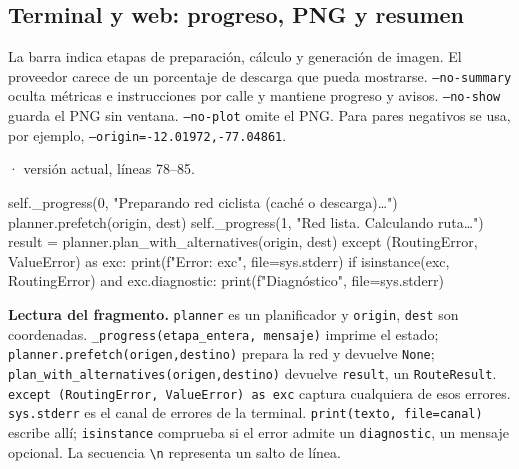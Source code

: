 \documentclass[11pt,a4paper]{article}
\begin{document}
\subsection{Terminal y web: progreso, PNG y resumen}
La barra indica etapas de preparación, cálculo y generación de imagen. El proveedor carece de un porcentaje de descarga que pueda mostrarse. \texttt{--no-summary} oculta métricas e instrucciones por calle y mantiene progreso y avisos. \texttt{--no-show} guarda el PNG sin ventana. \texttt{--no-plot} omite el PNG. Para pares negativos se usa, por ejemplo, \texttt{--origin=-12.01972,-77.04861}.

\smallskip
{\footnotesize\texttt{} · versión actual, líneas 78--85.}\par
\begin{Codigo}[firstnumber=78]
            self._progress(0, "Preparando red ciclista (caché o descarga)…")
            planner.prefetch(origin, dest)
            self._progress(1, "Red lista. Calculando ruta…")
            result = planner.plan_with_alternatives(origin, dest)
        except (RoutingError, ValueError) as exc:
            print(f"Error: {exc}", file=sys.stderr)
            if isinstance(exc, RoutingError) and exc.diagnostic:
                print(f"Diagnóstico", file=sys.stderr)
\end{Codigo}

\textbf{Lectura del fragmento.} \texttt{planner} es un planificador y \texttt{origin}, \texttt{dest} son coordenadas. \texttt{\_progress(etapa\_entera, mensaje)} imprime el estado; \texttt{planner.prefetch(origen,destino)} prepara la red y devuelve \texttt{None}; \texttt{plan\_with\_alternatives(origen,destino)} devuelve \texttt{result}, un \texttt{RouteResult}. \texttt{except (RoutingError, ValueError) as exc} captura cualquiera de esos errores. \texttt{sys.stderr} es el canal de errores de la terminal. \texttt{print(texto, file=canal)} escribe allí; \texttt{isinstance} comprueba si el error admite un \texttt{diagnostic}, un mensaje opcional. La secuencia \texttt{\textbackslash{}n} representa un salto de línea.
\end{document}
